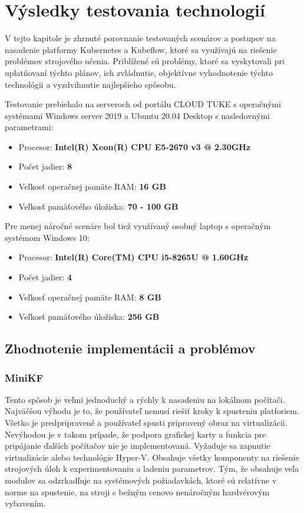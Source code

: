 
\chapter{Výsledky testovania technologií}
\label{evaluation}

V tejto kapitole je zhrnuté porovnanie testovaných scenárov a postupov na nasadenie platformy Kubernetes a Kubeflow, ktoré sa využívajú na riešenie problémov strojového učenia. Priblížené sú problémy, ktoré sa vyskytovali pri uplatňovaní týchto plánov, ich zvládnutie, objektívne vyhodnotenie týchto technológii a vyzdvihnutie najlepšieho spôsobu.

Testovanie prebiehalo na serveroch od portálu CLOUD TUKE s operačnými systémami Windows server 2019 a Ubuntu 20.04 Desktop s nasledovnými parametrami:

\begin{itemize}
	\item Procesor: \textbf{Intel(R) Xeon(R) CPU E5-2670 v3 @ 2.30GHz}
	\item Počet jadier: \textbf{8}
    \item Veľkosť operačnej pamäte RAM: \textbf{16 GB}
    \item Veľkosť pamäťového úložiska: \textbf{70 - 100 GB}
\end{itemize}

Pre menej náročné scenáre bol tiež využívaný osobný laptop s operačným systémom Windows 10:

\begin{itemize}
	\item Procesor: \textbf{Intel(R) Core(TM) CPU i5-8265U @ 1.60GHz}
	\item Počet jadier: \textbf{4}
    \item Veľkosť operačnej pamäte RAM: \textbf{8 GB}
    \item Veľkosť pamäťového úložiska: \textbf{256 GB}
\end{itemize}

\section{Zhodnotenie implementácii a problémov}

\subsection*{MiniKF}

Tento spôsob je veľmi jednoduchý a rýchly k nasadeniu na lokálnom počítači. Najväčšou výhodu je to, že používateľ nemusí riešiť kroky k spusteniu platforiem. Všetko je predpripravené a používateľ spusti pripravený obraz na virtualizácii. Nevýhodou je v takom prípade, že podpora grafickej karty a funkcia pre pripájanie ďalších počítačov nie je implementovaná. Vyžaduje sa zapnutie virtualizácie alebo technológie Hyper-V. Obsahuje všetky komponenty na riešenie strojových úloh k experimentovaniu a ladeniu parametrov. Tým, že obsahuje veľa modulov sa odzrkadľuje na systémových požiadavkách, ktoré sú relatívne v norme na spustenie, na stroji s bežným cenovo nenáročným hardvérovým vybavením.

